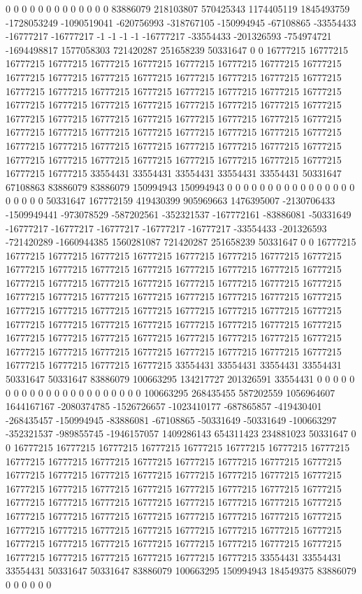 0 0 0 0 0 0 0 0 0 0 0 0 0 83886079 218103807 570425343 1174405119 1845493759 -1728053249 -1090519041 -620756993 -318767105 -150994945 -67108865 -33554433 -16777217 -16777217 -1 -1 -1 -1 -16777217 -33554433 -201326593 -754974721 -1694498817 1577058303 721420287 251658239 50331647 0 0 16777215 16777215 16777215 16777215 16777215 16777215 16777215 16777215 16777215 16777215 16777215 16777215 16777215 16777215 16777215 16777215 16777215 16777215 16777215 16777215 16777215 16777215 16777215 16777215 16777215 16777215 16777215 16777215 16777215 16777215 16777215 16777215 16777215 16777215 16777215 16777215 16777215 16777215 16777215 16777215 16777215 16777215 16777215 16777215 16777215 16777215 16777215 16777215 16777215 16777215 16777215 16777215 16777215 16777215 16777215 16777215 16777215 16777215 16777215 16777215 16777215 16777215 16777215 16777215 16777215 16777215 16777215 16777215 33554431 33554431 33554431 33554431 33554431 50331647 67108863 83886079 83886079 150994943 150994943 0 0 0 0 0 0 0
0 0 0 0 0 0 0 0 0 0 0 0 0 0 50331647 167772159 419430399 905969663 1476395007 -2130706433 -1509949441 -973078529 -587202561 -352321537 -167772161 -83886081 -50331649 -16777217 -16777217 -16777217 -16777217 -16777217 -33554433 -201326593 -721420289 -1660944385 1560281087 721420287 251658239 50331647 0 0 16777215 16777215 16777215 16777215 16777215 16777215 16777215 16777215 16777215 16777215 16777215 16777215 16777215 16777215 16777215 16777215 16777215 16777215 16777215 16777215 16777215 16777215 16777215 16777215 16777215 16777215 16777215 16777215 16777215 16777215 16777215 16777215 16777215 16777215 16777215 16777215 16777215 16777215 16777215 16777215 16777215 16777215 16777215 16777215 16777215 16777215 16777215 16777215 16777215 16777215 16777215 16777215 16777215 16777215 16777215 16777215 16777215 16777215 16777215 16777215 16777215 16777215 16777215 16777215 16777215 16777215 16777215 16777215 16777215 33554431 33554431 33554431 33554431 50331647 50331647 83886079 100663295 134217727 201326591 33554431 0 0 0 0 0 0
0 0 0 0 0 0 0 0 0 0 0 0 0 0 0 0 100663295 268435455 587202559 1056964607 1644167167 -2080374785 -1526726657 -1023410177 -687865857 -419430401 -268435457 -150994945 -83886081 -67108865 -50331649 -50331649 -100663297 -352321537 -989855745 -1946157057 1409286143 654311423 234881023 50331647 0 0 16777215 16777215 16777215 16777215 16777215 16777215 16777215 16777215 16777215 16777215 16777215 16777215 16777215 16777215 16777215 16777215 16777215 16777215 16777215 16777215 16777215 16777215 16777215 16777215 16777215 16777215 16777215 16777215 16777215 16777215 16777215 16777215 16777215 16777215 16777215 16777215 16777215 16777215 16777215 16777215 16777215 16777215 16777215 16777215 16777215 16777215 16777215 16777215 16777215 16777215 16777215 16777215 16777215 16777215 16777215 16777215 16777215 16777215 16777215 16777215 16777215 16777215 16777215 16777215 16777215 16777215 16777215 16777215 16777215 16777215 33554431 33554431 33554431 50331647 50331647 83886079 100663295 150994943 184549375 83886079 0 0 0 0 0 0
